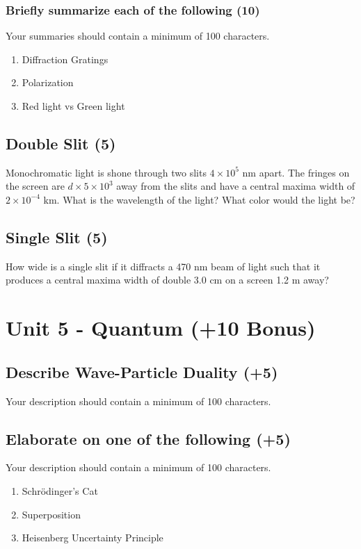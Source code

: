 \documentclass{article}
\begin{document}
\subsubsection{Briefly summarize each of the following (10)}
Your summaries should contain a minimum of 100 characters.
\begin{enumerate}[label=\alph*)]
    \item Diffraction Gratings
    \item Polarization
    \item Red light vs Green light
\end{enumerate}\leavevmode

\subsection{Double Slit (5)}
Monochromatic light is shone through two slits $4 \times 10^5$ nm apart. The fringes on the screen are $d \times 5 \times 10^3$ away from the slits and have a central maxima width of $2 \times 10^{-4}$ km. What is the wavelength of the light? What color would the light be?

\subsection{Single Slit (5)}
How wide is a single slit if it diffracts a 470 nm beam of light such that it produces a central maxima width of double 3.0 cm on a screen 1.2 m away?\\

\section{Unit 5 - Quantum (+10 Bonus)}
\subsection{Describe Wave-Particle Duality (+5)}
Your description should contain a minimum of 100 characters.

\subsection{Elaborate on one of the following (+5)}
Your description should contain a minimum of 100 characters.
\begin{enumerate}[label=\alph*)]
    \item Schrödinger's Cat
    \item Superposition
    \item Heisenberg Uncertainty Principle
\end{enumerate}\leavevmode\\
\end{document}
